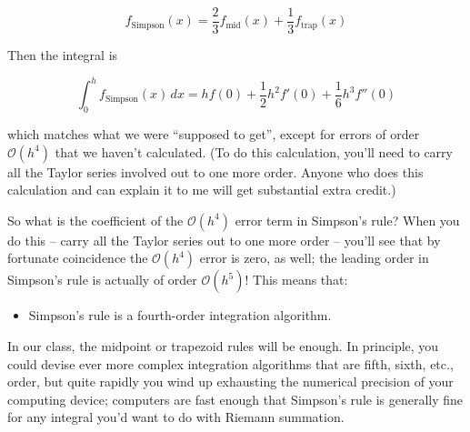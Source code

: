 \documentclass[12ampt]{article}   %
\begin{document}
 \begin{equation}
   f_{\mathrm{Simpson}}(x) = \frac{2}{3} f_{\mathrm{mid}}(x) + \frac{1}{3} f_{\mathrm{trap}}(x) 
 \end{equation}

 Then the integral is 

 \begin{equation}
 \int_0^h f_{\mathrm{Simpson}}(x)\, dx = hf(0) + \frac{1}{2}h^2 f'(0) + \frac{1}{6} h^3 f''(0)
 \end{equation}

 which matches what we were ``supposed to get'', except for errors of order $\mathcal O(h^4)$ that we haven't calculated. (To do this calculation, you'll need to carry all the Taylor series involved out to one more order.
 Anyone who does this calculation and can explain it to me will get substantial extra credit.)

 So what is the coefficient of the $\mathcal O(h^4)$ error term in Simpson's rule? When you do this -- carry all the Taylor series out to one more order -- you'll see that by fortunate coincidence the $\mathcal O(h^4)$
 error is zero, as well; the leading order in Simpson's rule is actually of order $\mathcal O(h^5)$! This means that:

 \begin{itemize}
   \item{Simpson's rule is a fourth-order integration algorithm.}
 \end{itemize}

 In our class, the midpoint or trapezoid rules will be enough. In principle, you could devise ever more complex integration algorithms that are fifth, sixth, etc., order, but quite rapidly you wind up exhausting the numerical precision
 of your computing device; computers are fast enough that Simpson's rule is generally fine for any integral you'd want to do with Riemann summation.

 
\end{document}

